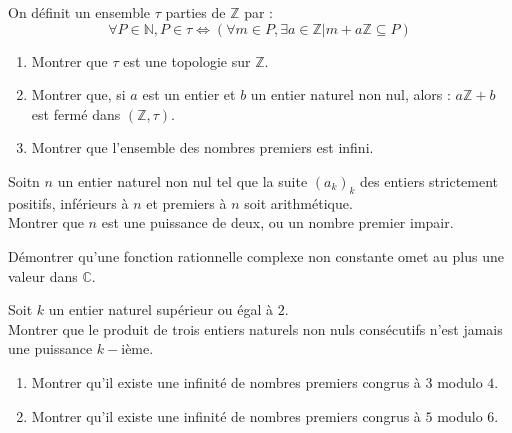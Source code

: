 \begin{exer}
On définit un ensemble $\tau$ parties de $\mathbb{Z}$ par :
\[\forall P \in \mathbb{N} , P \in \tau \Leftrightarrow ( \forall m \in P , \exists a \in \mathbb{Z} | m + a \mathbb{Z} \subseteq P)\]
\begin{enumerate}
\item Montrer que $\tau$ est une topologie sur $\mathbb{Z}$.
\item Montrer que, si $a$ est un entier et $b$ un entier naturel non nul, alors : %
$a \mathbb{Z} + b$ est fermé dans $(\mathbb{Z} , \tau)$.
\item Montrer que l'ensemble des nombres premiers est infini.
\end{enumerate}
\end{exer}

\begin{exer}
Soitn $n$ un entier naturel non nul tel que la suite $(a_k)_k$ des entiers strictement positifs, %
inférieurs à $n$ et premiers à $n$ soit arithmétique.\\
Montrer que $n$ est une puissance de deux, ou un nombre premier impair.
\end{exer}

\begin{exer}
Démontrer qu'une fonction rationnelle complexe non constante omet au plus une valeur dans $\mathbb{C}$.
\end{exer}

\begin{exer}
Soit $k$ un entier naturel supérieur ou égal à $2$.\\
Montrer que le produit de trois entiers naturels non nuls consécutifs n'est jamais une puissance $k-$ième.
\end{exer}

\begin{exer}
\begin{enumerate}
\item Montrer qu'il existe une infinité de nombres premiers congrus à $3$ modulo $4$.
\item Montrer qu'il existe une infinité de nombres premiers congrus à $5$ modulo $6$.
\end{enumerate}
\end{exer}

